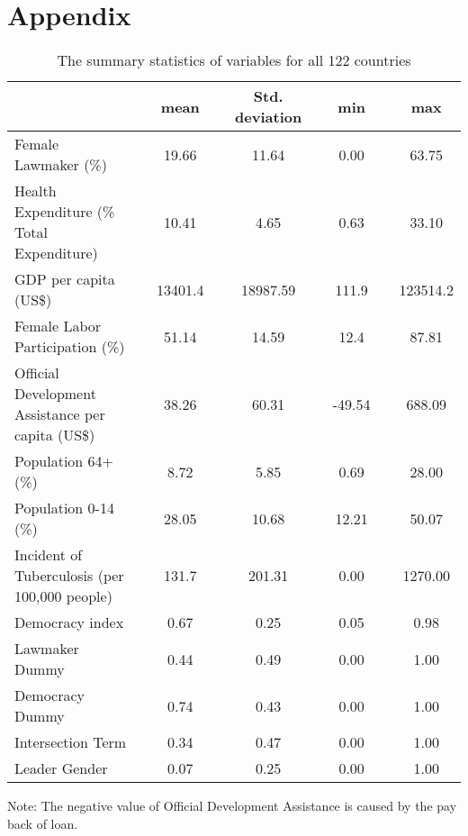 { %
\section*{Appendix}
\label{Appendix}

\begin{table}[H]
\centering
\addtolength{\tabcolsep}{-2.5pt}
\begin{tabular}{lcccccccc}
\hline
                                                  &  & mean    &  & Std. deviation &  & min    &  & max      \\ \hline
Female Lawmaker (\%)                              &  & 19.66   &  & 11.64          &  & 0.00   &  & 63.75    \\
Health Expenditure (\% Total Expenditure)                       &  & 10.41    &  & 4.65           &  & 0.63   &  & 33.10    \\
GDP per capita (US\$)                             &  & 13401.4 &  & 18987.59       &  & 111.9  &  & 123514.2 \\
Female Labor Participation (\%)                   &  & 51.14   &  & 14.59          &  & 12.4   &  & 87.81    \\
Official Development Assistance per capita (US\$) &  & 38.26   &  & 60.31          &  & -49.54 &  & 688.09   \\
Population 64+ (\%)                               &  & 8.72    &  & 5.85           &  & 0.69   &  & 28.00    \\
Population 0-14 (\%)                               &  & 28.05    &  & 10.68           &  & 12.21   &  & 50.07    \\
Incident of Tuberculosis (per 100,000 people)     &  & 131.7   &  & 201.31         &  & 0.00   &  & 1270.00  \\
Democracy index                                   &  & 0.67    &  & 0.25           &  & 0.05   &  & 0.98     \\ 
Lawmaker Dummy                                   &  & 0.44    &  & 0.49           &  & 0.00   &  & 1.00     \\ 
Democracy Dummy                                   &  & 0.74    &  & 0.43           &  & 0.00   &  & 1.00     \\
Intersection Term                                  &  & 0.34    &  & 0.47           &  & 0.00   &  & 1.00     \\  
Leader Gender                                   &  & 0.07    &  & 0.25           &  & 0.00   &  & 1.00     \\  \hline
\end{tabular}
\begin{tablenotes}
\small
      \item Note: The negative value of Official Development Assistance is caused by the pay back of loan.
    \end{tablenotes}
    \caption{The summary statistics of variables for all 122 countries}
    \label{Summary Statistics}
\end{table}





}
